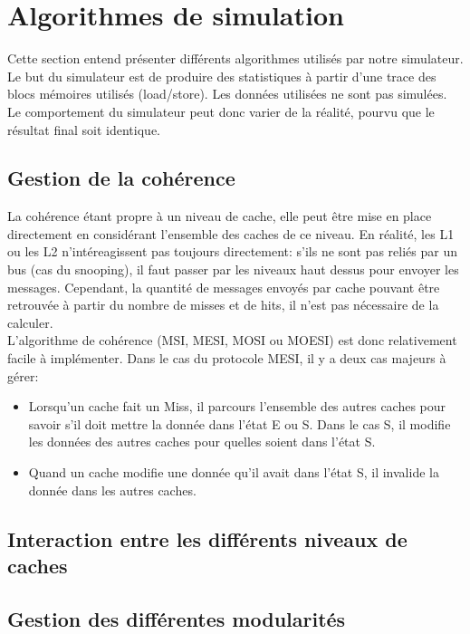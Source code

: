 \documentclass[a4paper]{article}
\begin{document}
\newpage
\section{Algorithmes de simulation}
\indent Cette section entend présenter différents algorithmes utilisés par notre simulateur. Le but du simulateur est de produire des statistiques à partir d'une trace des blocs mémoires utilisés (load/store). Les données utilisées ne sont pas simulées. Le comportement du simulateur peut donc varier de la réalité, pourvu que le résultat final soit identique.

\subsection{Gestion de la cohérence}
\indent La cohérence étant propre à un niveau de cache, elle peut être mise en place directement en considérant l'ensemble des caches de ce niveau. En réalité, les L1 ou les L2 n'intéreagissent pas toujours directement: s'ils ne sont pas reliés par un bus (cas du snooping), il faut passer par les niveaux haut dessus pour envoyer les messages. Cependant, la quantité de messages envoyés par cache pouvant être retrouvée à partir du nombre de misses et de hits, il n'est pas nécessaire de la calculer. \\

\indent L'algorithme de cohérence (MSI, MESI, MOSI ou MOESI) est donc relativement facile à implémenter. Dans le cas du protocole MESI, il y a deux cas majeurs à gérer: \\
\begin{itemize}
\item Lorsqu'un cache fait un Miss, il parcours l'ensemble des autres caches pour savoir s'il doit mettre la donnée dans l'état E ou S. Dans le cas S, il modifie les données des autres caches pour quelles soient dans l'état S.
\item Quand un cache modifie une donnée qu'il avait dans l'état S, il invalide la donnée dans les autres caches.
\end{itemize}

\subsection{Interaction entre les différents niveaux de caches}

\subsection{Gestion des différentes modularités}

\newpage
\nocite{*}


\end{document}
